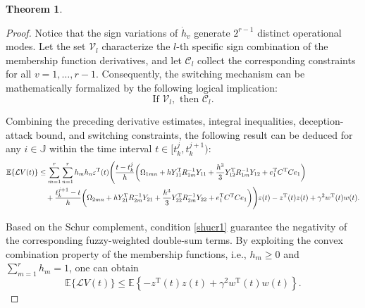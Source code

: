 \documentclass[preprint,review,fleqn,sort&compress,3p]{elsarticle}
\theoremstyle{definition} %
\theoremstyle{definition}%
\newtheorem{thm}{Theorem}[section]
\begin{document}
\begin{thm}
\begin{proof}
Notice that the sign variations of $\dot{h}_v$ generate $2^{r-1}$ distinct operational modes. Let the set $\mathcal{V}_l$ characterize the $l$-th specific sign combination of the membership function derivatives, and let $\mathcal{C}_l$ collect the corresponding constraints for all $v=1,\ldots,r-1$. Consequently, the switching mechanism can be mathematically formalized by the following logical implication:
\begin{equation}
	\text{If } \mathcal{V}_l, \text{ then } \mathcal{C}_l. \label{eq_if_then_2}
\end{equation}

Combining the preceding derivative estimates, integral inequalities, deception-attack bound, and switching constraints, the following result can be deduced for any $i \in \mathbb{J}$ within the time interval $t \in [t_k^j, t_k^{j+1})$:
\begin{align}
	\mathbb{E}\{\mathcal{L}V(t)\}
	&\leq
	\sum_{m=1}^{r} \sum_{n=1}^{r} h_m h_n \varepsilon^\mathrm{T}(t) \Bigg( 
	\frac{t - t_k^j}{h} \bigg( 
	\Omega_{1mn} 
	+ h  Y_{11}^{\mathrm{T}} R_{1m}^{-1} Y_{11} 
	+ \frac{h^3}{3} Y_{12}^{\mathrm{T}} R_{1m}^{-1} Y_{12}
	+ e_{1}^{\mathrm{T}} C^{\mathrm{T}}C e_1 \bigg) \notag \\
	&\quad + \frac{t_{k}^{j+1} - t}{h} \bigg( 
	\Omega_{2mn} 
	+ h Y_{21}^{\mathrm{T}} R_{2m}^{-1} Y_{21} 
	+ \frac{h^3}{3} Y_{22}^{\mathrm{T}} R_{2m}^{-1} Y_{22}
	+ e_{1}^{\mathrm{T}} C^{\mathrm{T}}C e_1  
	\bigg) \Bigg) \varepsilon(t) 
	- z^{\mathrm{T}}(t)z(t) + \gamma^2 w^{\mathrm{T}}(t)w(t).
\end{align}

Based on the Schur complement, condition \eqref{shucr1} guarantee the negativity of the corresponding fuzzy-weighted double-sum terms. By exploiting the convex combination property of the membership functions, i.e., $h_m \ge 0$ and $\sum_{m=1}^{r} h_m = 1$, one can obtain
\begin{equation}
	\mathbb{E}\{\mathcal{L}V(t)\}
	\leq
	\mathbb{E} \left\{
	-z^{\mathrm{T}}(t)z(t)
	+\gamma^2 w^{\mathrm{T}}(t)w(t)
	\right\}.
\end{equation}


\end{proof}
\end{thm}
\end{document}
